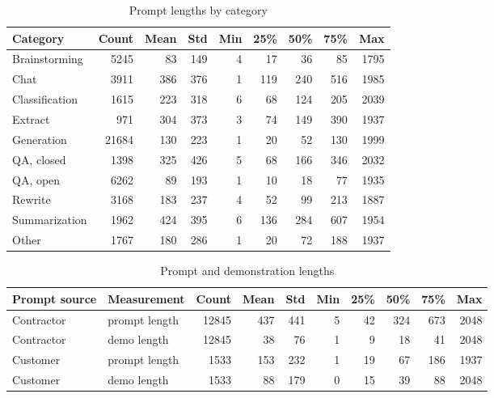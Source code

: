 \documentclass{article}
\begin{document}
\begin{table}[tp!]
    \centering
    \caption{Prompt lengths by category}
    \label{tab:prompt-lengths-by-tag}    \begin{tabular}{lrrrrrrrr}
    \toprule
    Category       &       Count & Mean &  Std & Min &  25\% &  50\% &  75\% &   Max \\
    \midrule
    Brainstorming  &        5245 &   83 &  149 &   4 &   17 &   36 &   85 &  1795 \\
    Chat           &        3911 &  386 &  376 &   1 &  119 &  240 &  516 &  1985 \\
    Classification &        1615 &  223 &  318 &   6 &   68 &  124 &  205 &  2039 \\
    Extract        &         971 &  304 &  373 &   3 &   74 &  149 &  390 &  1937 \\
    Generation     &       21684 &  130 &  223 &   1 &   20 &   52 &  130 &  1999 \\
    QA, closed     &        1398 &  325 &  426 &   5 &   68 &  166 &  346 &  2032 \\
    QA, open       &        6262 &   89 &  193 &   1 &   10 &   18 &   77 &  1935 \\
    Rewrite        &        3168 &  183 &  237 &   4 &   52 &   99 &  213 &  1887 \\
    Summarization  &        1962 &  424 &  395 &   6 &  136 &  284 &  607 &  1954 \\
    Other          &        1767 &  180 &  286 &   1 &   20 &   72 &  188 &  1937 \\
    \bottomrule
    \end{tabular}
\end{table}

\begin{table}[tp]
    \centering
    \caption{Prompt and demonstration lengths}
    \label{tab:prompt-and-demo-length}
    \begin{tabular}{llrrrrrrrr}
    \toprule 
    Prompt source & Measurement & Count  & Mean  & Std  & Min  & 25\%  & 50\%  & 75\%  & Max \\
    \midrule
    Contractor & prompt length  & 12845 & 437 & 441 & 5 & 42 & 324 & 673 & 2048 \\
    Contractor & demo length & 12845 & 38 & 76 & 1 & 9 & 18 & 41 & 2048 \\
    Customer & prompt length & 1533 & 153 & 232 & 1 & 19 & 67 & 186 & 1937 \\
    Customer & demo length & 1533 & 88 & 179 & 0 & 15 & 39 & 88 & 2048 \\
    \bottomrule
    \end{tabular}
\end{table}
\end{document}
